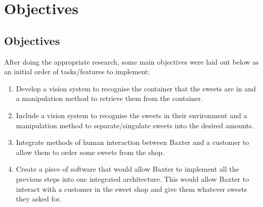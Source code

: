 \chapter{Objectives}
\label{chapter1}
\section{Objectives}
After doing the appropriate research, some main objectives were laid out below as an initial order of tasks/features to implement:
\begin{enumerate}
    \item{Develop a vision system to recognise the container that the sweets are in and a manipulation method to retrieve them from the container.}
    \item{Include a vision system to recognise the sweets in their environment and a manipulation method to separate/singulate sweets into the desired amounts.}
    \item{Integrate methods of human interaction between Baxter and a customer to allow them to order some sweets from the shop.}
    \item{Create a piece of software that would allow Baxter to implement all the previous steps into one integrated architecture. This would allow Baxter to interact with a customer in the sweet shop and give them whatever sweets they asked for.}
\end{enumerate}
